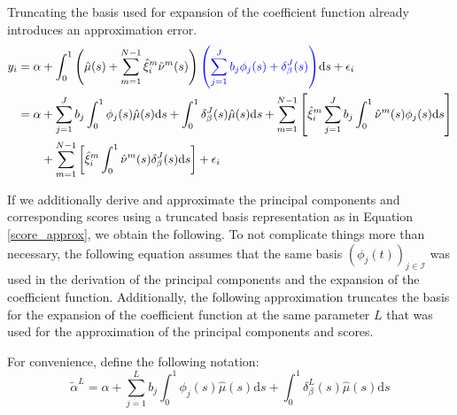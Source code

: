 \documentclass[11pt,twoside,a4paper]{article}
\begin{document}
	Truncating the basis used for expansion of the coefficient function already introduces an approximation error.
	\begin{equation}\label{fpcr_reg_both_expansions}
		\begin{split}
			y_i &= \alpha + \int_{0}^{1} \left(\hat{\mu}(s) + \sum_{m = 1}^{N-1} \hat{\xi}^{m}_i \hat{\nu}^{m}(s)\right) {\color{blue}\left(\sum_{j = 1}^{J} b_j \phi_j(s) + \delta_{\beta}^{J}(s)\right)} \mathrm{d}s + \epsilon_i\\
			&= \alpha + \sum_{j = 1}^{J} b_j \int_{0}^{1} \phi_j(s) \hat{\mu}(s) \mathrm{d}s + \int_{0}^{1} \delta_{\beta}^{J}(s) \hat{\mu}(s) \mathrm{d}s + \sum_{m = 1}^{N-1} \left[ \hat{\xi}^m_i \sum_{j = 1}^{J} b_j \int_{0}^{1}\hat{\nu}^m(s) \phi_j(s) \mathrm{d}s \right] \\
			& \quad \quad + \sum_{m = 1}^{N-1} \left[ \hat{\xi}^m_i \int_{0}^{1}\hat{\nu}^m(s) \delta_{\beta}^{J}(s) \mathrm{d}s \right] + \epsilon_i
		\end{split}
	\end{equation}

	If we additionally derive and approximate the principal components and corresponding scores using a truncated basis representation as in Equation \ref{score_approx}, we obtain the following. To not complicate things more than necessary, the following equation assumes that the same basis $\left(\phi_j(t)\right)_{j \in \mathcal{I}}$ was used in the derivation of the principal components and the expansion of the coefficient function. Additionally, the following approximation truncates the basis for the expansion of the coefficient function at the same parameter $L$ that was used for the approximation of the principal components and scores.
	
	For convenience, define the following notation:
	\begin{equation}
		\tilde{\alpha}^L = \alpha + \sum_{j = 1}^{L} b_j \int_{0}^{1} \phi_j(s) \hat{\mu}(s) \mathrm{d}s + \int_{0}^{1} \delta_{\beta}^{L}(s) \hat{\mu}(s) \mathrm{d}s
	\end{equation}
	
\end{document}
